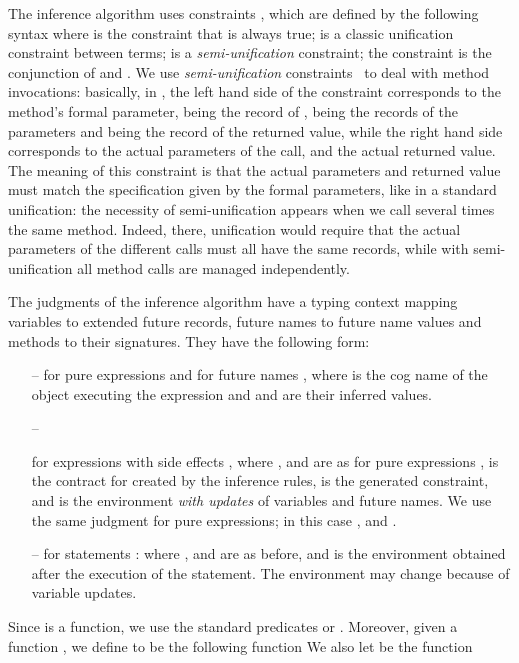 The inference algorithm  uses constraints , which 
are defined by the following syntax
{}
where  is the constraint that is always true;
  is a classic unification constraint between terms;
  is a {\em semi-unification} constraint; the constraint   is the conjunction of 
 and .
We use {\em semi-unification} constraints~\cite{Henglein:1993} to deal with method invocations: basically, in ,
 the left hand side of the constraint corresponds to the method's formal parameter,  being the record of ,  being the records of the parameters and  being the record of the returned value,
 while the right hand side corresponds to the actual parameters of the call, and the actual returned value.
The meaning of this constraint is that the actual parameters and returned value must match the specification given by the formal parameters, like in a standard unification:
 the necessity of semi-unification appears when we call several times the same method.
Indeed, there, unification would require that the actual parameters of the different calls must all have the same records, while with semi-unification all method calls are managed independently.

The judgments of the inference algorithm have a typing context  
mapping variables to extended future records, future names to future name
values and methods to 
their signatures. 
They have the following form:
\begin{itemize}
\item[--] 
for pure expressions  and  for
 future names , where 
 is the cog name of the object executing the expression and  and 
 are their inferred values.
\item[--]
 
for expressions with side effects , where , and  are as for pure expressions ,  is the contract for  created by the inference rules,
 is the generated constraint, and  is the environment  \emph{with updates} of variables and future names. We use the same 
judgment for pure expressions; in this case ,  and .
\item[--]
for statements :
 where
,  and  are as before, and
 is the environment obtained after the execution of the statement.
The environment may change because of 
variable updates.
\end{itemize}

Since  is a function, we use the standard predicates  or 
. Moreover, given a function , we define 
to be the following function
We also let  be the function

